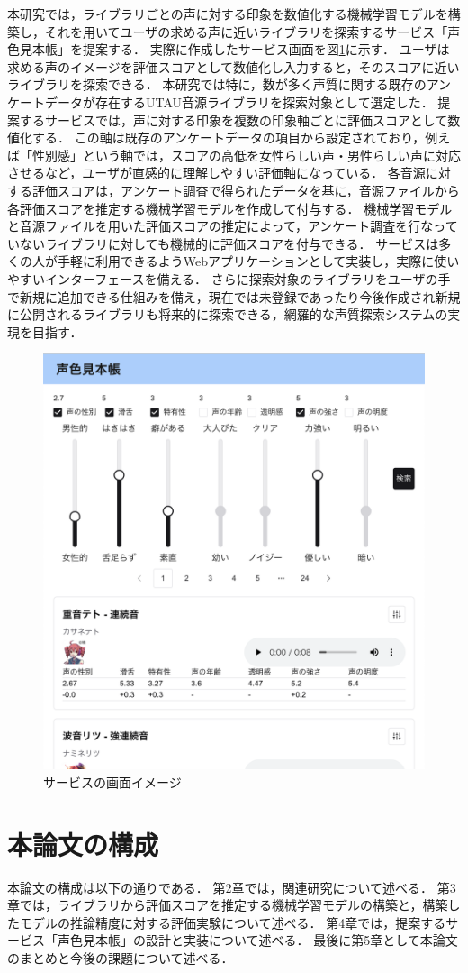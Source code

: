 本研究では，ライブラリごとの声に対する印象を数値化する機械学習モデルを構築し，それを用いてユーザの求める声に近いライブラリを探索するサービス「声色見本帳」を提案する．
実際に作成したサービス画面を図\ref{fig:site_image}に示す．
ユーザは求める声のイメージを評価スコアとして数値化し入力すると，そのスコアに近いライブラリを探索できる．
本研究では特に，数が多く声質に関する既存のアンケートデータが存在するUTAU音源ライブラリを探索対象として選定した．
提案するサービスでは，声に対する印象を複数の印象軸ごとに評価スコアとして数値化する．
この軸は既存のアンケートデータの項目から設定されており，例えば「性別感」という軸では，スコアの高低を女性らしい声・男性らしい声に対応させるなど，ユーザが直感的に理解しやすい評価軸になっている．
各音源に対する評価スコアは，アンケート調査で得られたデータを基に，音源ファイルから各評価スコアを推定する機械学習モデルを作成して付与する．
機械学習モデルと音源ファイルを用いた評価スコアの推定によって，アンケート調査を行なっていないライブラリに対しても機械的に評価スコアを付与できる．
サービスは多くの人が手軽に利用できるようWebアプリケーションとして実装し，実際に使いやすいインターフェースを備える．
さらに探索対象のライブラリをユーザの手で新規に追加できる仕組みを備え，現在では未登録であったり今後作成され新規に公開されるライブラリも将来的に探索できる，網羅的な声質探索システムの実現を目指す．

\begin{figure}[h]
  \centering
  \includegraphics[width=0.9\linewidth]{fig/site_image.png}
  \caption{サービスの画面イメージ}
  \label{fig:site_image}
\end{figure}

\section{本論文の構成}
本論文の構成は以下の通りである．
第2章では，関連研究について述べる．
第3章では，ライブラリから評価スコアを推定する機械学習モデルの構築と，構築したモデルの推論精度に対する評価実験について述べる．
第4章では，提案するサービス「声色見本帳」の設計と実装について述べる．
最後に第5章として本論文のまとめと今後の課題について述べる．

